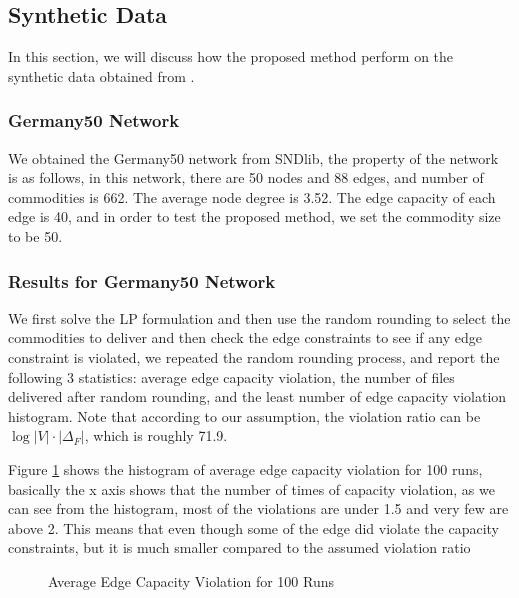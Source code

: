 \documentclass[conference]{IEEEtran}
\begin{document}
\subsection{Synthetic Data}

In this section, we will discuss how the proposed method perform on the synthetic data obtained from \cite{sndlib}. 

\subsubsection{Germany50 Network}

We obtained the Germany50 network from SNDlib, the property of the network is as follows, in this network, there are 50 nodes and 88 edges, and number of commodities is 662. The average node degree is 3.52. The edge capacity of each edge is 40, and in order to test the proposed method, we set the commodity size to be 50.  

\subsubsection{Results for Germany50 Network}

We first solve the LP formulation and then use the random rounding to select the commodities to deliver and then check the edge constraints to see if any edge constraint is violated, we repeated the random rounding process, and report the following 3 statistics: average edge capacity violation, the number of files delivered after random rounding, and the least number of edge capacity violation histogram. Note that according to our assumption, the violation ratio can be $\log|V| \cdot |\Delta_{F}|$, which is roughly 71.9.

Figure \ref{fig:violation} shows the histogram of average edge capacity violation for 100 runs, basically the x axis shows that the number of times of capacity violation, as we can see from the histogram, most of the violations are under 1.5 and very few are above 2. This means that even though some of the edge did violate the capacity constraints, but it is much smaller compared to the assumed violation ratio

\begin{figure}
	\begin{center}
		\caption{Average Edge Capacity Violation for 100 Runs}
		\label{fig:violation}
	\end{center}
\end{figure}
\end{document}
